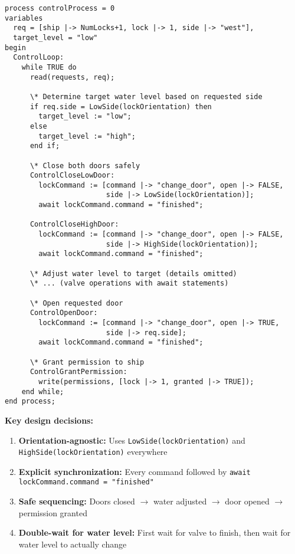\documentclass[12pt,a4paper]{article}
\begin{document}
\begin{lstlisting}[style=tlaplus, caption={Final Single Lock Controller (Simplified)}]
process controlProcess = 0
variables 
  req = [ship |-> NumLocks+1, lock |-> 1, side |-> "west"],
  target_level = "low"
begin
  ControlLoop:
    while TRUE do
      read(requests, req);
      
      \* Determine target water level based on requested side
      if req.side = LowSide(lockOrientation) then
        target_level := "low";
      else
        target_level := "high";
      end if;
      
      \* Close both doors safely
      ControlCloseLowDoor:
        lockCommand := [command |-> "change_door", open |-> FALSE, 
                        side |-> LowSide(lockOrientation)];
        await lockCommand.command = "finished";
      
      ControlCloseHighDoor:
        lockCommand := [command |-> "change_door", open |-> FALSE, 
                        side |-> HighSide(lockOrientation)];
        await lockCommand.command = "finished";
      
      \* Adjust water level to target (details omitted)
      \* ... (valve operations with await statements)
      
      \* Open requested door
      ControlOpenDoor:
        lockCommand := [command |-> "change_door", open |-> TRUE, 
                        side |-> req.side];
        await lockCommand.command = "finished";
      
      \* Grant permission to ship
      ControlGrantPermission:
        write(permissions, [lock |-> 1, granted |-> TRUE]);
    end while;
end process;
\end{lstlisting}

\textbf{Key design decisions:}

\begin{enumerate}
    \item \textbf{Orientation-agnostic:} Uses \texttt{LowSide(lockOrientation)} and \texttt{HighSide(lockOrientation)} everywhere
    \item \textbf{Explicit synchronization:} Every command followed by \texttt{await lockCommand.command = "finished"}
    \item \textbf{Safe sequencing:} Doors closed $\rightarrow$ water adjusted $\rightarrow$ door opened $\rightarrow$ permission granted
    \item \textbf{Double-wait for water level:} First wait for valve to finish, then wait for water level to actually change
\end{enumerate}
\end{document}
